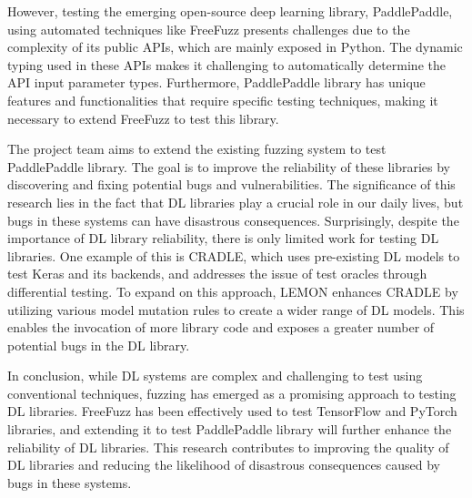 \documentclass[sigconf]{acmart}
\begin{document}
\par However, testing the emerging open-source deep learning library, PaddlePaddle, using automated techniques like FreeFuzz presents challenges due to the complexity of its public APIs, which are mainly exposed in Python. The dynamic typing used in these APIs makes it challenging to automatically determine the API input parameter types. Furthermore, PaddlePaddle library has unique features and functionalities that require specific testing techniques, making it necessary to extend FreeFuzz to test this library.
\par The project team aims to extend the existing fuzzing system to test PaddlePaddle library. The goal is to improve the reliability of these libraries by discovering and fixing potential bugs and vulnerabilities. The significance of this research lies in the fact that DL libraries play a crucial role in our daily lives, but bugs in these systems can have disastrous consequences. Surprisingly, despite the importance of DL library reliability, there is only limited work for testing DL libraries. One example of this is CRADLE, which uses pre-existing DL models to test Keras and its backends, and addresses the issue of test oracles through differential testing. To expand on this approach, LEMON enhances CRADLE by utilizing various model mutation rules to create a wider range of DL models. This enables the invocation of more library code and exposes a greater number of potential bugs in the DL library.
\par In conclusion, while DL systems are complex and challenging to test using conventional techniques, fuzzing has emerged as a promising approach to testing DL libraries. FreeFuzz has been effectively used to test TensorFlow and PyTorch libraries, and extending it to test PaddlePaddle library will further enhance the reliability of DL libraries. This research contributes to improving the quality of DL libraries and reducing the likelihood of disastrous consequences caused by bugs in these systems.
\end{document}
